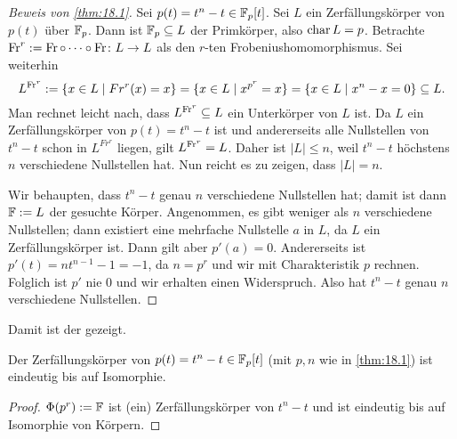 \documentclass[12pt,a4paper]{scrartcl}
\begin{document}
\begin{proof}[Beweis von \cref{thm:18.1}]
	Sei $p(t) = t^n-t\in\mathbb F_p[t]$. Sei $L$ ein Zerfällungskörper von $p(t)$ über $\mathbb F_p$. Dann ist $\mathbb F_p\subseteq L$ der Primkörper, also $\operatorname{char} L = p$. Betrachte $\operatorname{Fr}^r : = \operatorname{Fr}\circ\dots\circ \operatorname{Fr}\colon L\to L$ als den $r$-ten Frobeniushomomorphismus. Sei weiterhin
	\[L^{\operatorname{Fr}^r} := \{x\in L\mid Fr^r(x) = x\} = \{x\in L\mid x^{p^r} = x\} = \{x\in L\mid x^n -x = 0\}\subseteq L.\]
	Man rechnet leicht nach, dass $L^{\operatorname{Fr}^r}\subseteq L$ ein Unterkörper von $L$ ist. Da $L$ ein Zerfällungskörper von $p(t ) = t^n-t$ ist und andererseits alle Nullstellen von $t^n-t$ schon in $L^{Fr^r}$ liegen, gilt $L^{\operatorname{Fr}^r} = L$. Daher ist $|L|\leq n$, weil $t^n-t$ höchstens $n$ verschiedene Nullstellen hat. Nun reicht es zu zeigen, dass $|L| = n$.
	
	Wir behaupten, dass $t^n-t$ genau $n$ verschiedene Nullstellen hat; damit ist dann $\mathbb F := L$ der gesuchte Körper. Angenommen, es gibt weniger als $n$ verschiedene Nullstellen; dann existiert eine mehrfache Nullstelle $a$ in $L$, da $L$ ein Zerfällungskörper ist. Dann gilt aber $p'(a) = 0$. Andererseits ist $p'(t) = nt^{n-1}-1 = -1$, da $n = p^r$ und wir mit Charakteristik $p$ rechnen. Folglich ist $p'$ nie $0$ und wir erhalten einen Widerspruch. Also hat $t^n-t$ genau $n$ verschiedene Nullstellen.	
\end{proof}

Damit ist der  gezeigt.

\begin{kor}
	Der Zerfällungskörper von $p(t) = t^n-t\in\mathbb F_p[t]$ (mit $p,n$ wie in \cref{thm:18.1}) ist eindeutig bis auf Isomorphie.
\end{kor}
\begin{proof}
	$\Phi(p^r) := \mathbb F$ ist (ein) Zerfällungskörper von $t^n-t$ und ist eindeutig bis auf Isomorphie von Körpern.
\end{proof}	
\end{document}
